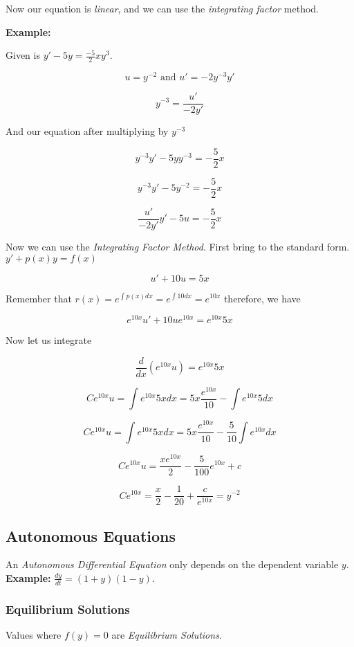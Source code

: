 Now our equation is \emph{linear}, and we can use the \emph{integrating factor} method.
\vspace{\baselineskip}

\textbf{Example: }
\vspace{\baselineskip}

Given is \(y' -5y = \frac{-5}{2}xy^3\).

\[
u = y^{-2}  \text{ and } u' = -2y^{-3}y'
\]

\[
y^{-3} = \frac{u'}{-2y'}
\]

And our equation after multiplying by \(y^{-3}\)

\[
 y^{-3}y' - 5yy^{-3} = -\frac{5}{2}x 
\]

\[
y^{-3}y' - 5y^{-2} = -\frac{5}{2}x 
\]

\[
\frac{u'}{-2y'}y' - 5u = -\frac{5}{2}x 
\]

Now we can use the \emph{Integrating Factor Method}. First bring to the standard form.
\(y' + p(x)y = f(x)\)

\[
  u' + 10u = 5x 
\]

Remember that \(r(x) = e^{\int p(x)dx} = e^{\int 10 dx} = e^{10x}\) therefore, we have

\[
e^{10x}u' + 10ue^{10x} = e^{10x}5x
\]

Now let us integrate

\[
\frac{d}{dx} \left(e^{10x}u\right) = e^{10x}5x
\]

\[
Ce^{10x}u = \int e^{10x} 5x dx = 5x \frac{e^{10x}}{10} - \int e^{10x}5dx
\]

\[
Ce^{10x}u = \int e^{10x} 5x dx = 5x \frac{e^{10x}}{10} - \frac{5}{10}\int e^{10x}dx
\]

\[
Ce^{10x}u = \frac{xe^{10x}}{2} - \frac{5}{100} e^{10x} + c
\]

\[
    Ce^{10x} = \frac{x}{2} - \frac{1}{20} + \frac{c}{e^{10x}} = y^{-2}
\]

\subsection{Autonomous Equations}

An \emph{Autonomous Differential Equation} only depends on the dependent
variable \(y\).\textbf{ Example: } \(\frac{dy}{dt} = (1 + y)(1 -y)\).

\subsubsection{Equilibrium Solutions}
Values where \(f(y) = 0\) are \emph{Equilibrium Solutions}.

